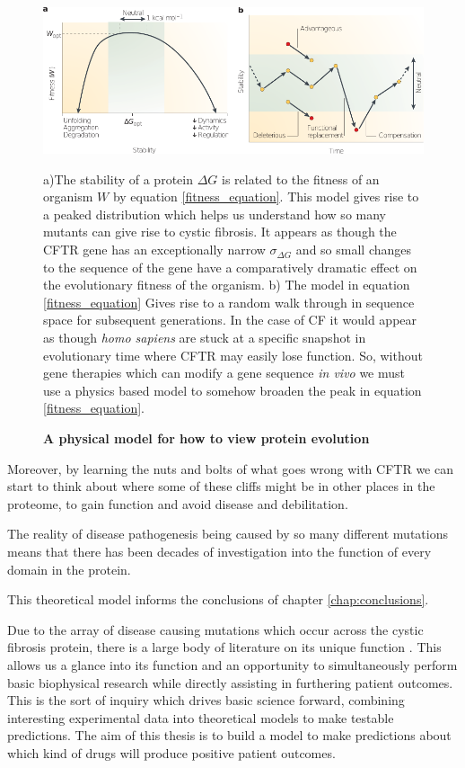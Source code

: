 \begin{figure}
	\begin{center}
		\includegraphics[width=1.0\textwidth]{figures/fitness_landscape_fig.pdf}
	\end{center}
	\captionsetup{singlelinecheck = false, justification=raggedright}
	\caption[A physical model for how to view protein evolution] {\textbf{A physical model for how to view protein evolution}}{a)The stability of a protein $\Delta G$ is related to the fitness of an organism $W$ by equation \ref{fitness_equation}. This model gives rise to a peaked distribution which helps us understand how so many mutants can give rise to cystic fibrosis. It appears as though the CFTR gene has an exceptionally narrow $\sigma_{\Delta G}$ and so small changes to the sequence of the gene have a comparatively dramatic effect on the evolutionary fitness of the organism. b) The model in equation \ref{fitness_equation} Gives rise to a random walk through in sequence space for subsequent generations. In the case of CF it would appear as though \textit{homo sapiens} are stuck at a specific snapshot in evolutionary time where CFTR may easily lose function. So, without gene therapies which can modify a gene sequence \textit {in vivo} we must use a physics based model to somehow broaden the peak in equation \ref{fitness_equation}.}
	\label{dna_structure}
\end{figure}

Moreover, by learning the nuts and bolts of what goes wrong with CFTR we can start to think about where some of these cliffs might be in other places in the proteome, to gain function and avoid disease and debilitation.

The reality of disease pathogenesis being caused by so many different mutations means that there has been decades of investigation into the function of every domain in the protein. 

This theoretical model informs the conclusions of chapter \ref{chap:conclusions}.

Due to the array of disease causing mutations which occur across the cystic fibrosis protein, there is a large body of literature on its unique function \cite{csanady2019a}. This allows us a glance into its function and an opportunity to simultaneously perform basic biophysical research while directly assisting in furthering patient outcomes. This is the sort of inquiry which drives basic science forward, combining interesting experimental data into theoretical models to make testable predictions. The aim of this thesis is to build a model to make predictions about which kind of drugs will produce positive patient outcomes.

